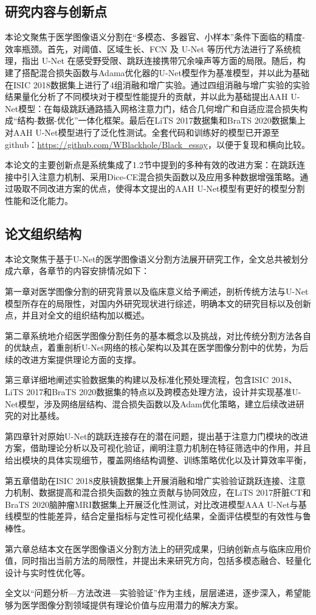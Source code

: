 \subsection{研究内容与创新点}

本论文聚焦于医学图像语义分割在“多模态、多器官、小样本”条件下面临的精度-效率瓶颈。首先，对阈值、区域生长、FCN 及 U-Net 等历代方法进行了系统梳理，指出 U-Net 在感受野受限、跳跃连接携带冗余噪声等方面的局限。随后，构建了搭配混合损失函数与Adama优化器的U-Net模型作为基准模型，并以此为基础在ISIC 2018数据集上进行了4组消融和增广实验。通过四组消融与增广实验的实验结果量化分析了不同模块对于模型性能提升的贡献，并以此为基础提出AAH U-Net模型：在每级跳跃通路插入网格注意力门，结合几何增广和自适应混合损失构成“结构-数据-优化”一体化框架。最后在LiTS 2017数据集和BraTS 2020数据集上对AAH U-Net模型进行了泛化性测试。全套代码和训练好的模型已开源至github：\url{https://github.com/WBlackhole/Black_essay}，以便于复现和横向比较。

本论文的主要创新点是系统集成了1.2节中提到的多种有效的改进方案：在跳跃连接中引入注意力机制、采用Dice-CE混合损失函数以及应用多种数据增强策略。通过吸取不同改进方案的优点，使得本文提出的AAH U-Net模型有更好的模型分割性能和泛化能力。

\subsection{论文组织结构}

本论文聚焦于基于U-Net的医学图像语义分割方法展开研究工作，全文总共被划分成六章，各章节的内容安排情况如下：

第一章对医学图像分割的研究背景以及临床意义给予阐述，剖析传统方法与U-Net模型所存在的局限性，对国内外研究现状进行综述，明确本文的研究目标以及创新点，并且对全文的组织结构加以概述。

第二章系统地介绍医学图像分割任务的基本概念以及挑战，对比传统分割方法各自的优缺点，着重剖析U-Net网络的核心架构以及其在医学图像分割中的优势，为后续的改进方案提供理论方面的支撑。

第三章详细地阐述实验数据集的构建以及标准化预处理流程，包含ISIC 2018、LiTS 2017和BraTS 2020数据集的特点以及跨模态处理方法，设计并实现基准U-Net模型，涉及网络层结构、混合损失函数以及Adam优化策略，建立后续改进研究的对比基线。

第四章针对原始U-Net的跳跃连接存在的潜在问题，提出基于注意力门模块的改进方案，借助理论分析以及可视化验证，阐明注意力机制在特征筛选中的作用，并且给出模块的具体实现细节，覆盖网络结构调整、训练策略优化以及计算效率平衡，

第五章借助在ISIC 2018皮肤镜数据集上开展消融和增广实验验证跳跃连接、注意力机制、数据提高和混合损失函数的独立贡献与协同效应，在LiTS 2017肝脏CT和BraTS 2020脑肿瘤MRI数据集上开展泛化性测试，对比改进模型AAA U-Net与基线模型的性能差异，结合定量指标与定性可视化结果，全面评估模型的有效性与鲁棒性。

第六章总结本文在医学图像语义分割方法上的研究成果，归纳创新点与临床应用价值，同时指出当前方法的局限性，并提出未来研究方向，包括多模态融合、轻量化设计与实时性优化等。

全文以“问题分析—方法改进—实验验证”作为主线，层层递进，逐步深入，希望能够为医学图像分割领域提供有理论价值与应用潜力的解决方案。